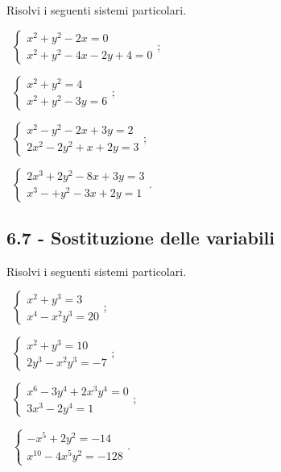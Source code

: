 \begin{esercizio}[\Ast]
 \label{ese:6.61}
Risolvi i seguenti sistemi particolari.
\begin{multicols}{2}
 \begin{enumeratea}
 \item~$\left\{\begin{array}{l}x^2+y^2-2x=0\\x^{2}+y^{2}-4x-2y+4=0\end{array}\right.$;
 \item~$\left\{\begin{array}{l}x^{2}+y^{2}=4 \\x^2+y^2-3y=6 \end{array}\right.$;
 \item~$\left\{\begin{array}{l}x^{2}-y^{2}-2x+3y=2 \\2x^2-2y^2+x+2y=3 \end{array}\right.$;
 \item~$\left\{\begin{array}{l}2x^3+2y^2-8x+3y=3 \\x^3-+y^2-3x+2y=1 \end{array}\right.$.
 \end{enumeratea}
\end{multicols}
\end{esercizio}

\subsection*{6.7 - Sostituzione delle variabili}

\begin{esercizio}[\Ast]
 \label{ese:6.62}
Risolvi i seguenti sistemi particolari.
\begin{multicols}{2}
 \begin{enumeratea}
 \item~$\left\{\begin{array}{l}x^2+y^3=3\\x^{4}-x^{2}y^{3}=20\end{array}\right.$;
 \item~$\left\{\begin{array}{l}x^{2}+y^{3}=10 \\2y^{3}-x^{2}y^{3}=-7 \end{array}\right.$;
 \item~$\left\{\begin{array}{l}x^{6}-3y^{4}+2x^{3}y^{4}=0 \\3x^{3}-2y^{4}=1 \end{array}\right.$;
 \item~$\left\{\begin{array}{l}-x^5+2y^2=-14 \\x^{10}-4x^{5}y^{2}=-128 \end{array}\right.$.
 \end{enumeratea}
\end{multicols}
\end{esercizio}

